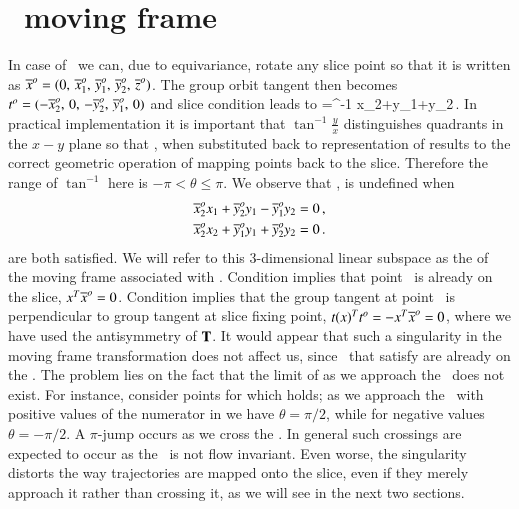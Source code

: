 \section{\label{sec:CLeMovFr}\CLe\ moving frame}

In case of \cLe\ we can, due to equivariance, rotate any slice point so that it is written as
${\overline{x}^o}=(0,\,{\overline{x}^o_{1}},\,{\overline{y}^o_{1}},\,{\overline{y}^o_{2}},\,{\overline{z}^o_{}})$.
The group orbit tangent then becomes
$t^o_{}=(-{\overline{x}^o_{2}},\,0,\,-{\overline{y}^o_{2}},\,{\overline{y}^o_{1}},\,0)$
and slice condition  leads to
\beq
  \theta=\tan^{-1}
			  {x_2+y_1+y_2}\,.
In practical implementation it is important that $\tan^{-1}\frac{y}{x}$ distinguishes quadrants
in the $x-y$ plane so that , when substituted back to representation  of 
results to the correct geometric operation of mapping points back to the slice.
Therefore the range of $\tan^{-1}$ here is $-\pi<\theta\leq\pi$. We observe that ,
is undefined when
\begin{subequations}\label{cLeMFsing}
  \begin{align}
    \slicepComp{x}{2}x_1+\slicepComp{y}{2}y_1-\slicepComp{y}{1}y_2 &=0 \label{cLeMFsingOnSlice}\cont
    \slicepComp{x}{2}x_2+\slicepComp{y}{1}y_1+\slicepComp{y}{2}y_2 &=0 \label{cLeMFsingPerpTan}\,.
  \end{align}
\end{subequations}
are both satisfied. We will refer to this $3$-dimensional linear subspace as the \emph{\sset} of the moving
frame associated with . Condition  implies that point \ssp\ is already
on the slice, $x^T{\overline{x}^o}=0$. Condition  implies that the group tangent
at point \ssp\ is perpendicular to group tangent at slice fixing point,
$t{}(x)^Tt^o_{}=-x^T{\overline{x}^o}=0$, where we have used the antisymmetry of $\mathbf{T}$.
It would appear that such a singularity in the moving frame transformation does not affect us,
since \ssp\ that satisfy  are already on the \slice. The problem lies on the fact
that the limit of  as we approach the \sset\ does not exist.
For instance, consider points for which 
holds; as we approach the \sset\ with positive values of the numerator in 
we have $\theta=\pi/2$, while for negative values $\theta=-\pi/2$. A $\pi$-jump occurs as
we cross the \sset. In general such crossings are expected to occur as the \sset\ is not
flow invariant. Even worse, the singularity distorts the way trajectories
are mapped onto the slice, even if they merely approach it rather than crossing it, as we
will see in the next two sections.

